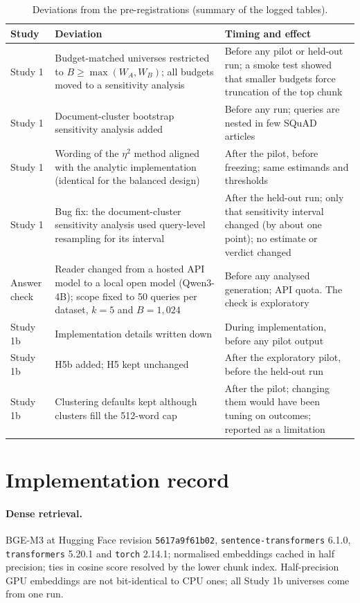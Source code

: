 \documentclass[11pt]{article}
\begin{document}
\begin{table}[htbp]\centering\footnotesize
\caption{Deviations from the pre-registrations (summary of the logged tables).}\label{tab:deviations}
\begin{tabular}{@{}p{1.6cm}p{6.4cm}p{6.4cm}@{}}\toprule
Study & Deviation & Timing and effect\\\midrule
Study 1 & Budget-matched universes restricted to $B \ge \max(W_A, W_B)$; all budgets moved to a sensitivity analysis &
Before any pilot or held-out run; a smoke test showed that smaller budgets force truncation of the top chunk\\
Study 1 & Document-cluster bootstrap sensitivity analysis added & Before any run; queries are nested in few SQuAD
articles\\
Study 1 & Wording of the $\eta^2$ method aligned with the analytic implementation (identical for the balanced design)
& After the pilot, before freezing; same estimands and thresholds\\
Study 1 & Bug fix: the document-cluster sensitivity analysis used query-level resampling for its interval & After the
held-out run; only that sensitivity interval changed (by about one point); no estimate or verdict changed\\
Answer check & Reader changed from a hosted API model to a local open model (Qwen3-4B); scope fixed to 50 queries per
dataset, $k=5$ and $B=1{,}024$ & Before any analysed generation; API quota. The check is exploratory\\
Study 1b & Implementation details written down & During implementation, before any pilot output\\
Study 1b & H5b added; H5 kept unchanged & After the exploratory pilot, before the held-out run\\
Study 1b & Clustering defaults kept although clusters fill the 512-word cap & After the pilot; changing them would have
been tuning on outcomes; reported as a limitation\\\bottomrule
\end{tabular}
\end{table}

\section{Implementation record}\label{app:impl}
\paragraph{Dense retrieval.} BGE-M3 at Hugging Face revision \texttt{5617a9f61b02}, \texttt{sentence-transformers}
6.1.0, \texttt{transformers} 5.20.1 and \texttt{torch} 2.14.1; normalised embeddings cached in half precision; ties in
cosine score resolved by the lower chunk index. Half-precision GPU embeddings are not bit-identical to CPU ones; all
Study 1b universes come from one run.
\end{document}
